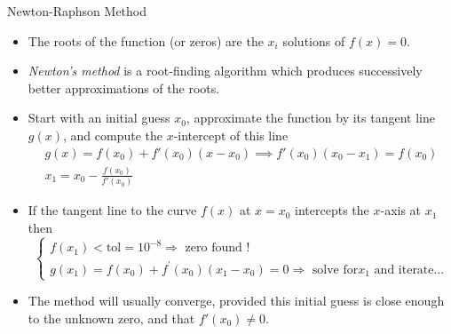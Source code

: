 \documentclass{beamer}
\begin{document}
\begin{frame}[fragile]{Newton-Raphson Method}
\begin{itemize}
    \item The roots of the function (or zeros) are the $x_i$ solutions of $f(x) = 0$.
    \item \emph{Newton's method} is a root-finding algorithm which produces successively better approximations of the roots.
    \item Start with an initial guess $x_0$, approximate the function by its tangent line $g(x)$, and compute the $x$-intercept of this line
    \begin{gather*}
g(x) = f(x_0) + f'(x_0)(x-x_0) \implies  f'(x_0)(x_0-x_1)=f(x_0)\\
	x_1=x_0-\frac {f(x_0)}{f'(x_0)}
\end{gather*}
    \item If the tangent line to the curve $f(x)$ at $x = x_0$ intercepts the $x$-axis at $x_{1}$ then
\begin{equation*}
\begin{cases}
f(x_1) < \text{tol}=10^{-8} \Rightarrow \text{ zero found !}\\
g(x_1) = f(x_0) + f^{'}(x_0)(x_1-x_0) = 0 \Rightarrow \text{ solve for
}x_1\text{ and iterate...}
\end{cases}
\end{equation*}
\item The method will usually converge, provided this initial guess is close enough to the unknown zero, and that $f'(x_0) \neq 0$.
\end{itemize}
\end{frame}
\end{document}

